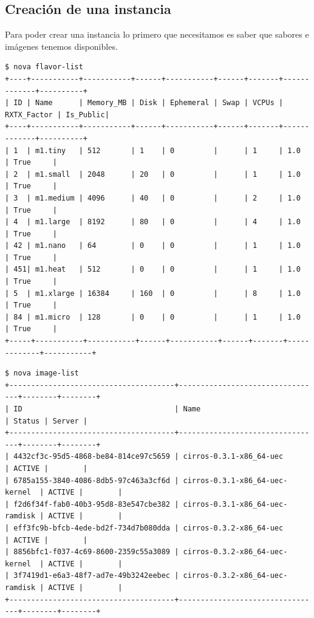 \documentclass{article}
\begin{document}
\subsection{Creación de una instancia}
	Para poder crear una instancia lo primero que necesitamos es saber que sabores e imágenes tenemos disponibles.
\begin{lstlisting}[style=miniBash]
$ nova flavor-list
+----+-----------+-----------+------+-----------+------+-------+-------------+----------+
| ID | Name      | Memory_MB | Disk | Ephemeral | Swap | VCPUs | RXTX_Factor | Is_Public|
+----+-----------+-----------+------+-----------+------+-------+-------------+----------+
| 1  | m1.tiny   | 512       | 1    | 0         |      | 1     | 1.0         | True     |
| 2  | m1.small  | 2048      | 20   | 0         |      | 1     | 1.0         | True     |
| 3  | m1.medium | 4096      | 40   | 0         |      | 2     | 1.0         | True     |
| 4  | m1.large  | 8192      | 80   | 0         |      | 4     | 1.0         | True     |
| 42 | m1.nano   | 64        | 0    | 0         |      | 1     | 1.0         | True     |
| 451| m1.heat   | 512       | 0    | 0         |      | 1     | 1.0         | True     |
| 5  | m1.xlarge | 16384     | 160  | 0         |      | 8     | 1.0         | True     |
| 84 | m1.micro  | 128       | 0    | 0         |      | 1     | 1.0         | True     |
+-----+-----------+-----------+------+-----------+------+-------+-------------+-----------+
\end{lstlisting}

\begin{lstlisting}[style=miniBash]
$ nova image-list
+--------------------------------------+---------------------------------+--------+--------+
| ID                                   | Name                            | Status | Server |
+--------------------------------------+---------------------------------+--------+--------+
| 4432cf3c-95d5-4868-be84-814ce97c5659 | cirros-0.3.1-x86_64-uec         | ACTIVE |        |
| 6785a155-3840-4086-8db5-97c463a3cf6d | cirros-0.3.1-x86_64-uec-kernel  | ACTIVE |        |
| f2d6f34f-fab0-40b3-95d8-83e547cbe382 | cirros-0.3.1-x86_64-uec-ramdisk | ACTIVE |        |
| eff3fc9b-bfcb-4ede-bd2f-734d7b080dda | cirros-0.3.2-x86_64-uec         | ACTIVE |        |
| 8856bfc1-f037-4c69-8600-2359c55a3089 | cirros-0.3.2-x86_64-uec-kernel  | ACTIVE |        |
| 3f7419d1-e6a3-48f7-ad7e-49b3242eebec | cirros-0.3.2-x86_64-uec-ramdisk | ACTIVE |        |
+--------------------------------------+---------------------------------+--------+--------+
\end{lstlisting}
\end{document}
